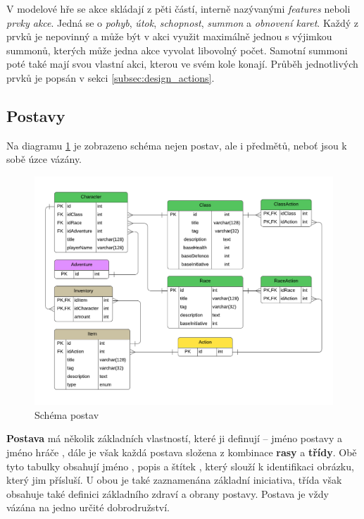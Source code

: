V modelové hře se akce skládají z pěti částí, interně nazývanými \textit{features} neboli \textit{prvky akce}. Jedná se o \textit{pohyb}, \textit{útok}, \textit{schopnost}, \textit{summon} a \textit{obnovení karet}. Každý z prvků je nepovinný a může být v akci využit maximálně jednou s výjimkou summonů, kterých může jedna akce vyvolat libovolný počet. Samotní summoni poté také mají svou vlastní akci, kterou ve svém kole konají. Průběh jednotlivých prvků je popsán v sekci \ref{subsec:design_actions}.


\subsection{Postavy}
\label{subsec:schema_character}

Na diagramu \ref{diag:er_character} je zobrazeno schéma nejen postav, ale i předmětů, neboť jsou k sobě úzce vázány. 

\begin{figure}[h]
    \centering
    \includegraphics[scale=0.8]{../../shared/diagrams/er_character.pdf}
    \caption{Schéma postav}
    \label{diag:er_character}
\end{figure}

\textbf{Postava} má několik základních vlastností, které ji definují -- jméno postavy  a jméno hráče , dále je však každá postava složena z kombinace \textbf{rasy} a \textbf{třídy}. Obě tyto tabulky obsahují jméno , popis  a štítek , který slouží k identifikaci obrázku, který jim přísluší. U obou je také zaznamenána základní iniciativa, třída však obsahuje také definici základního zdraví a obrany postavy. Postava je vždy vázána na jedno určité dobrodružství.

